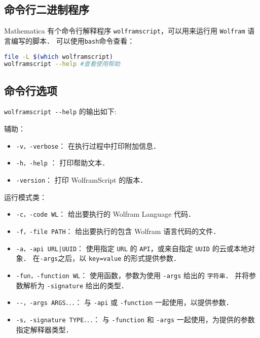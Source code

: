 
\begin{issues}
\issueDraft
\issueTODO
\end{issues}

\subsection{命令行二进制程序}

Mathematica 有个命令行解释程序 \verb`wolframscript`，可以用来运行用 \verb`Wolfram` 语言编写的脚本．
可以使用\verb`bash`命令查看：
\begin{lstlisting}[language=bash]
file -L $(which wolframscript)
wolframscript --help #查看使用帮助
\end{lstlisting}

\subsection{命令行选项} 

\verb`wolframscript --help` 的输出如下:

辅助：
\begin{itemize}
\item \verb`-v，-verbose`： 在执行过程中打印附加信息．
\item \verb`-h，-help` ： 打印帮助文本．
\item \verb`-version`： 打印 WolframScript 的版本．
\end{itemize}

运行模式类：
\begin{itemize}
\item \verb`-c，-code WL`： 给出要执行的 Wolfram Language 代码．
\item \verb`-f，-file PATH`： 给出要执行的包含 Wolfram 语言代码的文件．
\item \verb`-a，-api URL|UUID`： 使用指定 \verb`URL` 的 \verb`API`，或来自指定 \verb`UUID` 的云或本地对象． 
在\verb`-args`之后，以 \verb`key=value` 的形式提供参数．
\item \verb`-fun，-function WL`： 使用函数，参数为使用 \verb`-args` 给出的 \verb`字符串`．
并将参数解析为 \verb`-signature` 给出的类型．
\item \verb`--，-args ARGS．．．`： 与 \verb`-api` 或 \verb`-function` 一起使用，以提供参数．
\item \verb`-s，-signature TYPE．．．`： 与 \verb`-function` 和 \verb`-args` 一起使用，为提供的参数指定解释器类型．
\end{itemize}

